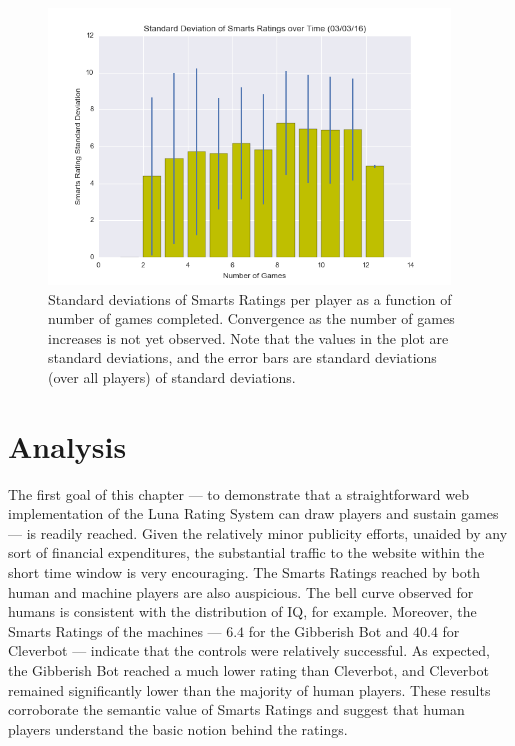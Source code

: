 \begin{figure}
\includegraphics[width=0.95\textwidth]{figures/varianceGamesPlayed.png}
\caption{\label{smartRatingStds} Standard deviations of Smarts Ratings per player as a function of number of games completed. Convergence as the number of games increases is not yet observed. Note that the values in the plot are standard deviations, and the error bars are standard deviations (over all players) of standard deviations.}
\end{figure}

\section{Analysis}

The first goal of this chapter --- to demonstrate that a straightforward web implementation of the Luna Rating System can draw players and sustain games --- is readily reached. Given the relatively minor publicity efforts, unaided by any sort of financial expenditures, the substantial traffic to the website within the short time window is very encouraging. The Smarts Ratings reached by both human and machine players are also auspicious. The bell curve observed for humans is consistent with the distribution of IQ, for example. Moreover, the Smarts Ratings of the machines --- $6.4$ for the Gibberish Bot and $40.4$ for Cleverbot --- indicate that the controls were relatively successful. As expected, the Gibberish Bot reached a much lower rating than Cleverbot, and Cleverbot remained significantly lower than the majority of human players. These results corroborate the semantic value of Smarts Ratings and suggest that human players understand the basic notion behind the ratings.

